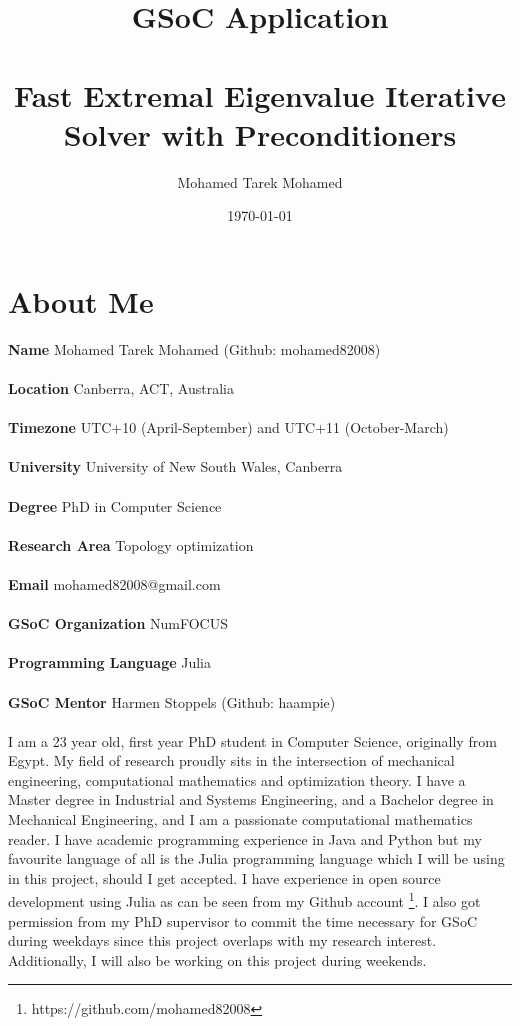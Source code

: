 \documentclass[12pt]{article}
\begin{document}
\begin{titlepage}
\title{
	\textbf{GSoC Application} \\~\\
	Fast Extremal Eigenvalue Iterative Solver with Preconditioners\\
}
\author{Mohamed Tarek Mohamed}
\date{\today}
\maketitle
\thispagestyle{empty}
\tableofcontents
\end{titlepage}

\section{About Me}

\bigskip
\bigskip
\textbf{Name} Mohamed Tarek Mohamed (Github: mohamed82008) \\~\\
\textbf{Location} Canberra, ACT, Australia \\~\\
\textbf{Timezone} UTC+10 (April-September) and UTC+11 (October-March) \\~\\
\textbf{University} University of New South Wales, Canberra \\~\\
\textbf{Degree} PhD in Computer Science \\~\\
\textbf{Research Area} Topology optimization \\~\\
\textbf{Email} mohamed82008@gmail.com \\~\\
\textbf{GSoC Organization} NumFOCUS \\~\\
\textbf{Programming Language} Julia \\~\\
\textbf{GSoC Mentor} Harmen Stoppels (Github: haampie) \\~\\

I am a 23 year old, first year PhD student in Computer Science, originally from Egypt. My field of research proudly sits in the intersection of mechanical engineering, computational mathematics and optimization theory. I have a Master degree in Industrial and Systems Engineering, and a Bachelor degree in Mechanical Engineering, and I am a passionate computational mathematics reader. I have academic programming experience in Java and Python but my favourite language of all is the Julia programming language which I will be using in this project, should I get accepted. I have experience in open source development using Julia as can be seen from my Github account \footnote{https://github.com/mohamed82008}. I also got permission from my PhD supervisor to commit the time necessary for GSoC during weekdays since this project overlaps with my research interest. Additionally, I will also be working on this project during weekends.
\end{document}
